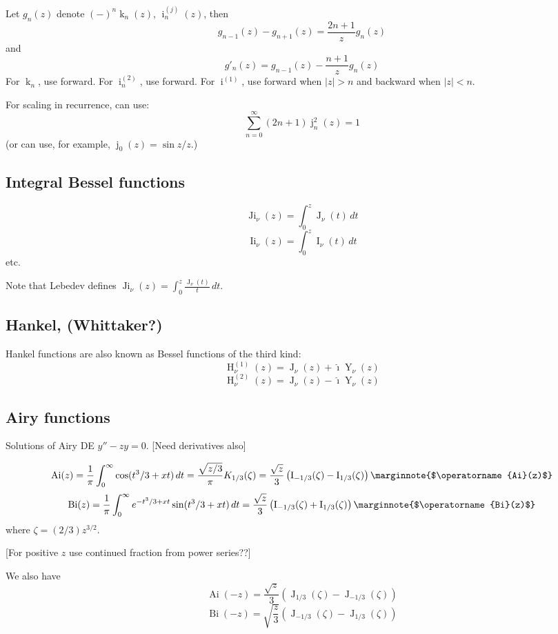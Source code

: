 \documentclass[10pt,dvipdfmx,letterpaper,twoside]{article}
\let\O=\operatorname
\newcommand{\ii}{{\hat{\imath}}}
\let\DEF=\marginnote
\begin{document}
Let $g_n(z)$ denote $(-)^n\O{k}_n(z)$, $\O{i}^{(j)}_n(z)$, then
\[ g_{n-1}(z) - g_{n+1}(z) = \frac{2n+1}{z} g_n(z) \]
and
\[ g'_n(z) = g_{n-1}(z) - \frac{n+1}{z} g_n(z) \]
For $\O{k}_n$, use forward.  For $\O{i}^{(2)}_n$, use forward.  For $\O{i}^{(1)}$, use forward when $|z|>n$ and backward when $|z|<n$.

For scaling in recurrence, can use:
\[ \sum_{n=0}^\infty (2n+1)\O{j}_n^2(z) = 1 \]
(or can use, for example, $\O{j}_0(z)=\sin z / z$.)

\subsection{Integral Bessel functions}

\[ \O{Ji}_\nu(z) = \int_0^z \O{J}_\nu(t)\,dt \]
\[ \O{Ii}_\nu(z) = \int_0^z \O{I}_\nu(t)\,dt \]
etc.

Note that Lebedev defines $\O{Ji}_\nu(z) = \int_0^z\frac{\O{J}_\nu(t)}{t}\,dt$.

\subsection{Hankel, (Whittaker?)}

Hankel functions are also known as Bessel functions of the third kind:
\[ \O{H}^{(1)}_\nu(z) = \O{J}_\nu(z) + \ii\O{Y}_\nu(z) \]
\[ \O{H}^{(2)}_\nu(z) = \O{J}_\nu(z) - \ii\O{Y}_\nu(z) \]

\subsection{Airy functions}
Solutions of Airy DE $y'' - z y = 0$.
[Need derivatives also]

\[ \O{Ai}(z) = \frac1\pi \int_0^\infty \cos(t^3/3 + xt)\,dt
  = \frac{\sqrt{z/3}}{\pi}K_{1/3}(\zeta)
  = \frac{\sqrt{z}}{3}\left( \O{I}_{-1/3}(\zeta) - \O{I}_{1/3}(\zeta) \right)
  \DEF{$\O{Ai}(z)$} \]
\[ \O{Bi}(z) = \frac1\pi \int_0^\infty e^{-t^3/3 + xt}\sin(t^3/3 + xt)\,dt
  = \frac{\sqrt{z}}{3}\left( \O{I}_{-1/3}(\zeta) + \O{I}_{1/3}(\zeta) \right)
  \DEF{$\O{Bi}(z)$} \]
where $\zeta = (2/3)z^{3/2}$.

[For positive $z$ use continued fraction from power series??]

We also have
\[ \O{Ai}(-z) = \frac{\sqrt{z}}{3}\left( \O{J}_{1/3}(\zeta) - \O{J}_{-1/3}(\zeta) \right) \]
\[ \O{Bi}(-z) = \sqrt{\frac{z}{3}}\left( \O{J}_{-1/3}(\zeta) - \O{J}_{1/3}(\zeta) \right) \]
\end{document}
